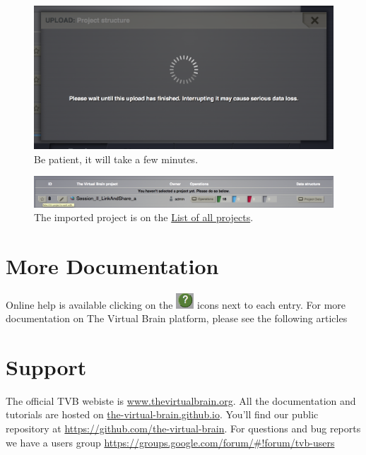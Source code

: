 \documentclass{tufte-handout}
\begin{document}
\begin{figure}
  \includegraphics[width=\linewidth]{Handout_UI_ImportingProjects_Wait}%
  \caption{Be patient, it will take a few minutes.}%
  \label{fig:importwait}%
\end{figure}

\begin{figure}
  \includegraphics[width=\linewidth]{Handout_UI_ImportingProjects_Done}%
  \caption{The imported project is on the \underline{List of all projects}.}%
  \label{fig:importdone}%
\end{figure}


\newpage

\section{More Documentation}\label{sec:more-doc}
Online help is available clicking on the \includegraphics[width=0.05\textwidth]{butt_green_help} icons next to each entry.
For more documentation on The Virtual Brain platform, please see the following articles \citep{Sanz-Leon_2013, Woodman_2014}


\section{Support}\label{sec:support}

The official TVB webiste is \url{www.thevirtualbrain.org}.  
All the documentation and tutorials are hosted on \url{the-virtual-brain.github.io}.
You'll find our public  repository at \url{https://github.com/the-virtual-brain}. 
For questions and bug reports we have a users group \url{https://groups.google.com/forum/#!forum/tvb-users}



\end{document}
